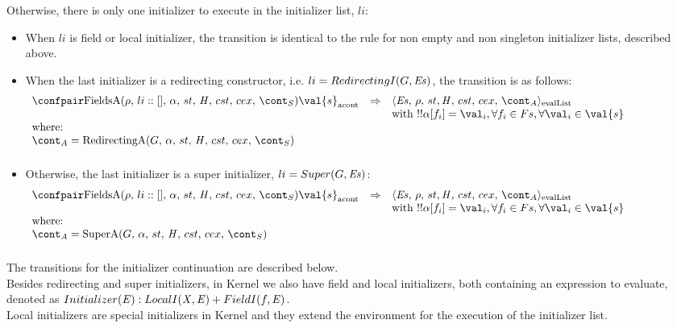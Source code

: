 \documentclass{article}
\begin{document}
\noindent
Otherwise, there is only one initializer to execute in the initializer list, $li$: \\
\begin{itemize}

\item When $li$ is field or local initializer, the transition is identical to the rule for non empty and non singleton initializer lists, described above.\\
\item When the last initializer is a redirecting constructor, i.e. $li = RedirectingI(G, \mathit{E}\mathit{s})$, the transition is as follows:
\[
  \begin{array}{lcl@{\hspace{30mm}}}
	\acontconf{\FieldsA{\env}{li::[]}{\loc}{\scont}}{\val{s}}
	& \Rightarrow &
	\evallistconf{\exprs}{\env}{\strace}{\cstrace}{\cex}{\acont}\\
	&&\textrm{with }\deref{\deref{\loc[f_i]}} = \val_{i}, \forall f_i \in Fs, \forall \val_i \in \val{s}\\
	\textrm{where:}\\
	\acont = \RedirectingA{G}{\loc}{\scont}\\[2mm]
  \end{array}
\]

\item Otherwise, the last initializer is a super initializer, $li = Super(G, \mathit{E}\mathit{s})$:
\[
  \begin{array}{lcl@{\hspace{30mm}}}
	\acontconf{\FieldsA{\env}{li::[]}{\loc}{\scont}}{\val{s}}
	& \Rightarrow &
	\evallistconf{\exprs}{\env}{\strace}{\cstrace}{\cex}{\acont}\\
	&&\textrm{with }\deref{\deref{\loc[f_i]}} = \val_{i}, \forall f_i \in Fs, \forall \val_i \in \val{s}\\
	\textrm{where:}\\
	\acont = \SuperA{G}{\loc}{\scont}\\[2mm]
  \end{array}
\]
\end{itemize}
The transitions for the initializer continuation are described below.\\[2mm]
\noindent
Besides redirecting and super initializers, in Kernel we also have field and local initializers, both containing an expression to evaluate, denoted as $Initializer(\mathit{E}) : LocalI(\mathit{X}, \mathit{E}) + FieldI(f, \mathit{E})$.\\[2mm]
Local initializers are special initializers in Kernel and they extend the environment for the execution of the initializer list.
\end{document}
